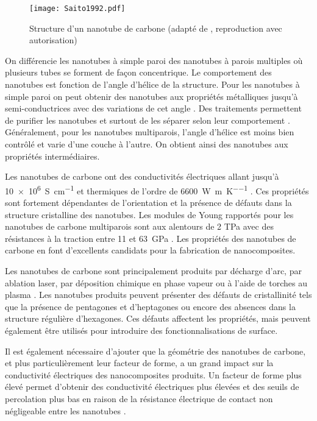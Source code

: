 \begin{figure}[htb]
	\centering
	\texttt{[image: Saito1992.pdf]}
	\caption{Structure d'un nanotube de carbone (adapté de \cite{Saito1992}, reproduction avec autorisation)}
	\label{structure_nanotube}
\end{figure}

On différencie les nanotubes à simple paroi des nanotubes à parois multiples où plusieurs tubes se forment de façon concentrique. 
Le comportement des nanotubes est fonction de l'angle d'hélice de la structure. 
Pour les nanotubes à simple paroi on peut obtenir des nanotubes aux propriétés métalliques jusqu'à semi-conductrices avec des variations de cet angle \cite{Saito1992}. 
Des traitements permettent de purifier les nanotubes et surtout de les séparer selon leur comportement \cite{Makama2013}. 
Généralement, pour les nanotubes multiparois, l'angle d'hélice est moins bien contrôlé et varie d'une couche à l'autre.
On obtient ainsi des nanotubes aux propriétés intermédiaires. 

Les nanotubes de carbone ont des conductivités électriques allant jusqu'à \SI[locale=FR]{10e6}{\siemens\per\centi\metre}  \cite{Sathyanarayana2013} et thermiques de l'ordre de \SI[locale=FR]{6600}{\watt\per\metre\per\kelvin} \cite{Berber2000}. 
Ces propriétés sont fortement dépendantes de l'orientation et la présence de défauts dans la structure cristalline des nanotubes. 
Les modules de Young rapportés pour les nanotubes de carbone multiparois sont aux alentours de 2 TPa avec des résistances à la traction entre 11 et \SI[locale=FR]{63}{\giga\pascal} \cite{Mittal2014h}. 
Les propriétés des nanotubes de carbone en font d'excellents candidats pour la fabrication de nanocomposites. 

Les nanotubes de carbone sont principalement produits par décharge d'arc, par ablation laser, par déposition chimique en phase vapeur \cite{Sathyanarayana2013} ou à l'aide de torches au plasma \cite{Kim2009e}. 
Les nanotubes produits peuvent présenter des défauts de cristallinité tels que la présence de pentagones et d'heptagones ou encore des absences dans la structure régulière d'hexagones. 
Ces défauts affectent les propriétés, mais peuvent également être utilisés pour introduire des fonctionnalisations de surface. 

Il est également nécessaire d'ajouter que la géométrie des nanotubes de carbone, et plus particulièrement leur facteur de forme, a un grand impact sur la conductivité électriques des nanocomposites produits. 
Un facteur de forme plus élevé permet d'obtenir des conductivité électriques plus élevées et des seuils de percolation plus bas en raison de la résistance électrique de contact non négligeable entre les nanotubes \cite{Hu2008}. 

